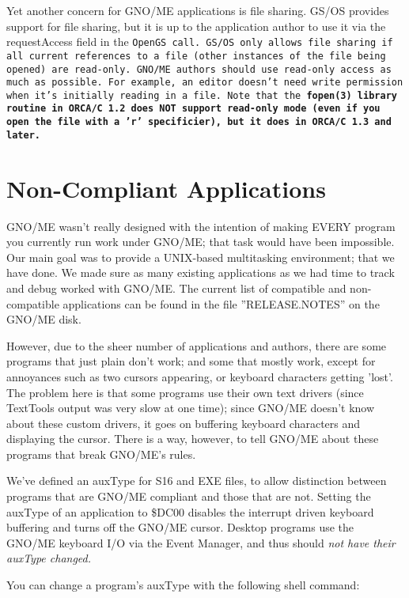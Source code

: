 \documentclass{report}
\begin{document}
Yet another concern for GNO/ME applications
is file sharing. GS/OS provides support for file sharing, but it
is up to the application author to use it via the requestAccess
field in the \tt OpenGS \rm call.
GS/OS only allows file sharing if all current
references to a file (other instances of the file being opened)
are read-only. GNO/ME authors should use read-only access as much
as possible. For example, an editor doesn't need write permission
when it's initially reading in a file. Note that the  \bf fopen\rm (3)
library routine in ORCA/C 1.2 does NOT support read-only mode
(even if you open the file with a 'r' specificier), but it does
in ORCA/C 1.3 and later.

\section{Non-Compliant Applications}

GNO/ME wasn't really designed with the
intention of making EVERY program you currently run work under
GNO/ME; that task would have been impossible. Our main goal was
to provide a UNIX-based multitasking environment; that we have
done. We made sure as many existing applications as we had time
to track and debug worked with GNO/ME. The current list of
compatible and non-compatible applications can be found in the
file ''RELEASE.NOTES'' on the GNO/ME disk.

However, due to the sheer number of
applications and authors, there are some programs that just plain
don't work; and some that mostly work, except for annoyances such
as two cursors appearing, or keyboard characters getting 'lost'.
The problem here is that some programs use their own text drivers
(since TextTools output was very slow at one time); since GNO/ME
doesn't know about these custom drivers, it goes on buffering
keyboard characters and displaying the cursor. There is a way,
however, to tell GNO/ME about these programs that break GNO/ME's
rules.

We've defined an auxType for S16 and EXE
files, to allow distinction between programs that are GNO/ME
compliant and those that are not. Setting the auxType of an
application to \$DC00 disables the interrupt driven keyboard
buffering and turns off the GNO/ME cursor. Desktop programs use
the GNO/ME keyboard I/O via the Event Manager, and thus should \em not \rm
have their auxType changed.

You can change a program's auxType with the
following shell command:
\end{document}
